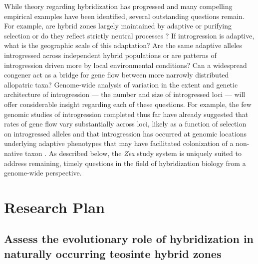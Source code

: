  While theory regarding hybridization has progressed and many compelling empirical examples have been identified, several outstanding questions remain. 
For example, are hybrid zones largely maintained by adaptive or purifying selection or do they reflect strictly neutral processes \citep{Kruuk1999, Rasmussen2012, Smith2013b}? 
If introgression is adaptive, what is the geographic scale of this adaptation?
Are the same adaptive alleles introgressed across independent hybrid populations or are patterns of introgression driven more by local environmental conditions?
Can a widespread congener act as a bridge for gene flow between more narrowly distributed allopatric taxa?
Genome-wide analysis of variation in the extent and genetic architecture of introgression --- the number and size of introgressed loci ---  will offer considerable insight regarding each of these questions.  
For example, the few genomic studies of introgression completed thus far have already suggested that rates of gene flow vary substantially across loci, likely as a function of selection on introgressed alleles \citep{Hufford2013, Poelstra2014} and that introgression has occurred at genomic locations underlying adaptive phenotypes that may have facilitated colonization of a non-native taxon \citep{Hufford2013}.
As described below, the \emph{Zea} study system is uniquely suited to address remaining, timely questions in the field of hybridization biology from a genome-wide perspective.

\section*{Research Plan}
\subsection{Assess the evolutionary role of hybridization in naturally occurring teosinte hybrid zones}
\label{ss:hybrids}

